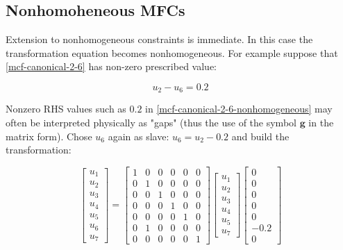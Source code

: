 \documentclass[10pt,b5paper,titlepage]{book}
\begin{document}
\subsection{Nonhomoheneous MFCs}

Extension to nonhomogeneous constraints is immediate. In this case the transformation
equation becomes nonhomogeneous. For example suppose that \eqref{mcf-canonical-2-6}
has non-zero prescribed value:

\begin{equation}\label{mcf-canonical-2-6-nonhomogeneous}
    u_2 - u_6 = 0.2
\end{equation}

Nonzero RHS values such as $ 0.2 $ in \eqref{mcf-canonical-2-6-nonhomogeneous}
may often be interpreted physically as "gaps" (thus the use of the symbol
$ \mathbf{g} $ in the matrix form). Chose $ u_6 $ again as slave: $ u_6 = u_2 - 0.2 $
and build the transformation:

\begin{equation}
    \begin{bmatrix}
        u_1 \\
        u_2 \\
        u_3 \\
        u_4 \\
        u_5 \\
        u_6 \\
        u_7
    \end{bmatrix}
    = \begin{bmatrix}
        1 & 0 & 0 & 0 & 0 & 0 \\
        0 & 1 & 0 & 0 & 0 & 0 \\
        0 & 0 & 1 & 0 & 0 & 0 \\
        0 & 0 & 0 & 1 & 0 & 0 \\
        0 & 0 & 0 & 0 & 1 & 0 \\
        0 & 1 & 0 & 0 & 0 & 0 \\
        0 & 0 & 0 & 0 & 0 & 1
    \end{bmatrix}
    \begin{bmatrix}
        u_1 \\
        u_2 \\
        u_3 \\
        u_4 \\
        u_5 \\
        u_7
    \end{bmatrix}
    \begin{bmatrix}
        0 \\
        0 \\
        0 \\
        0 \\
        0 \\
        -0.2 \\
        0
    \end{bmatrix}
\end{equation}
\end{document}
